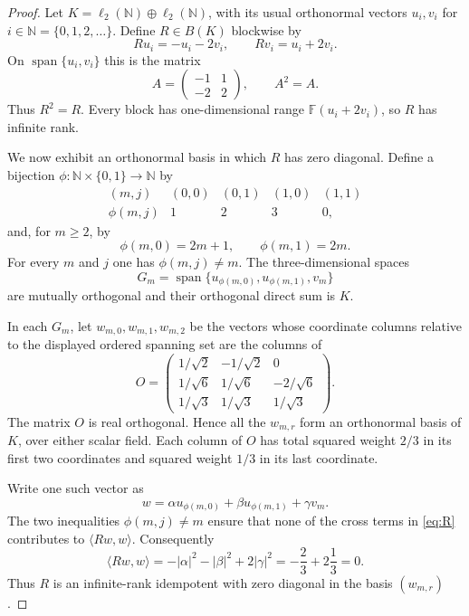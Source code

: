 \documentclass[11pt]{article}
\newcommand{\F}{\mathbb F}
\newcommand{\N}{\mathbb N}
\begin{document}
\begin{proof}
Let $K=\ell_2(\N)\oplus\ell_2(\N)$, with its usual orthonormal vectors
$u_i,v_i$ for $i\in\N=\{0,1,2,\ldots\}$.  Define $R\in B(K)$ blockwise by
\begin{equation}\label{eq:R}
 Ru_i=-u_i-2v_i,\qquad Rv_i=u_i+2v_i.
\end{equation}
On $\operatorname{span}\{u_i,v_i\}$ this is the matrix
\[
 A=\begin{pmatrix}-1&1\\-2&2\end{pmatrix},
 \qquad A^2=A.
\]
Thus $R^2=R$.  Every block has one-dimensional range
$\F(u_i+2v_i)$, so $R$ has infinite rank.

We now exhibit an orthonormal basis in which $R$ has zero diagonal.  Define a
bijection $\phi:\N\times\{0,1\}\to\N$ by
\[
\begin{array}{c|cccc}
(m,j)&(0,0)&(0,1)&(1,0)&(1,1)\\ \hline
\phi(m,j)&1&2&3&0,
\end{array}
\]
and, for $m\ge2$, by
\[
 \phi(m,0)=2m+1,\qquad \phi(m,1)=2m.
\]
For every $m$ and $j$ one has $\phi(m,j)\ne m$.  The three-dimensional
spaces
\[
 G_m=\operatorname{span}\{u_{\phi(m,0)},u_{\phi(m,1)},v_m\}
\]
are mutually orthogonal and their orthogonal direct sum is $K$.

In each $G_m$, let $w_{m,0},w_{m,1},w_{m,2}$ be the vectors whose coordinate
columns relative to the displayed ordered spanning set are the columns of
\begin{equation}\label{eq:O}
 O=\begin{pmatrix}
 1/\sqrt2&-1/\sqrt2&0\\
 1/\sqrt6& 1/\sqrt6&-2/\sqrt6\\
 1/\sqrt3& 1/\sqrt3& 1/\sqrt3
 \end{pmatrix}.
\end{equation}
The matrix $O$ is real orthogonal.  Hence all the $w_{m,r}$ form an
orthonormal basis of $K$, over either scalar field.  Each column of $O$ has
total squared weight $2/3$ in its first two coordinates and squared weight
$1/3$ in its last coordinate.

Write one such vector as
\[
 w=\alpha u_{\phi(m,0)}+\beta u_{\phi(m,1)}+\gamma v_m.
\]
The two inequalities $\phi(m,j)\ne m$ ensure that none of the cross terms in
\eqref{eq:R} contributes to $\langle Rw,w\rangle$.  Consequently
\[
 \langle Rw,w\rangle
 =-|\alpha|^2-|\beta|^2+2|\gamma|^2
 =-\frac23+2\frac13=0.
\]
Thus $R$ is an infinite-rank idempotent with zero diagonal in the basis
$(w_{m,r})$.


\end{proof}
\end{document}
